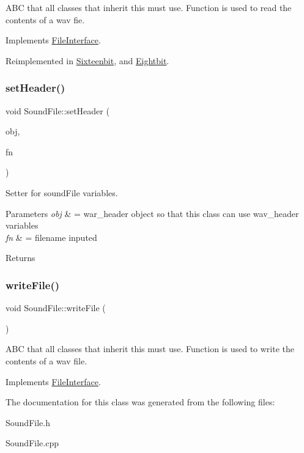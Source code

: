 A\+BC that all classes that inherit this must use. Function is used to read the contents of a wav fie. 

Implements \hyperlink{classFileInterface_ad6a8364f2255b7d724622eb8828b2c1c}{File\+Interface}.



Reimplemented in \hyperlink{classSixteenbit_ab34f06b23dabdf172f1c0990c5648ff1}{Sixteenbit}, and \hyperlink{classEightbit_a52c70b7685cfca5f810d441a20ec5745}{Eightbit}.

\mbox{\label{classSoundFile_ab867a2098653a80f9eb89d39b4ad3f03}} 
\subsubsection{\texorpdfstring{set\+Header()}{setHeader()}}
{\footnotesize\ttfamily void Sound\+File\+::set\+Header (\begin{DoxyParamCaption}\item[{\hyperlink{structWAV__HEADER}{W\+A\+V\+\_\+\+H\+E\+A\+D\+ER} $\ast$}]{obj,  }\item[{string}]{fn }\end{DoxyParamCaption})}

Setter for sound\+File variables. 
\begin{DoxyParams}{Parameters}
{\em obj} & = war\+\_\+header object so that this class can use wav\+\_\+header variables \\
\hline
{\em fn} & = filename inputed \\
\hline
\end{DoxyParams}
\begin{DoxyReturn}{Returns}

\end{DoxyReturn}
\mbox{\label{classSoundFile_aaaa496c20586d179906a301f0b4ab3a5}} 
\subsubsection{\texorpdfstring{write\+File()}{writeFile()}}
{\footnotesize\ttfamily void Sound\+File\+::write\+File (\begin{DoxyParamCaption}{ }\end{DoxyParamCaption})\hspace{0.3cm}{\ttfamily [virtual]}}

A\+BC that all classes that inherit this must use. Function is used to write the contents of a wav file. 

Implements \hyperlink{classFileInterface_a46344a063894f43e2594f4dca786756a}{File\+Interface}.



The documentation for this class was generated from the following files\+:\begin{DoxyCompactItemize}
\item 
Sound\+File.\+h\item 
Sound\+File.\+cpp\end{DoxyCompactItemize}
